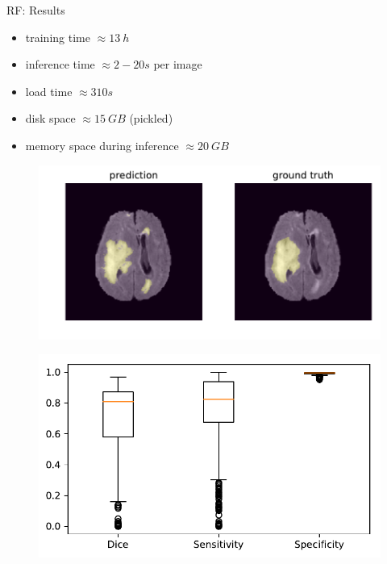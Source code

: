 \documentclass[final]{beamer}
\newlength{\onecolwid}
\newlength{\twocolwid}
\begin{document}
\begin{frame}[t]
\begin{columns}[t]
\begin{column}{\twocolwid}

\begin{columns}[t,totalwidth=\twocolwid] %

\begin{column}{\onecolwid} %

\begin{block}{RF: Results}
\begin{itemize}[label={}]
\item training time $\approx \SI{13}{h}$
\item inference time $\approx \si{2-20}{s}$ per image
\item load time $\approx \si{310}{s}$
\item disk space $\approx \SI{15}{GB}$ (pickled)
\item memory space during inference $\approx \SI{20}{GB}$
\end{itemize}
\begin{figure}
\centering
\includegraphics[width=0.8\linewidth]{rf_prediction_84}
\end{figure}
\begin{figure}
\centering
\includegraphics[width=0.8\linewidth]{boxplots}
\end{figure}
\end{block}


\end{column}
\end{columns}
\end{column}
\end{columns}
\end{frame}
\end{document}
